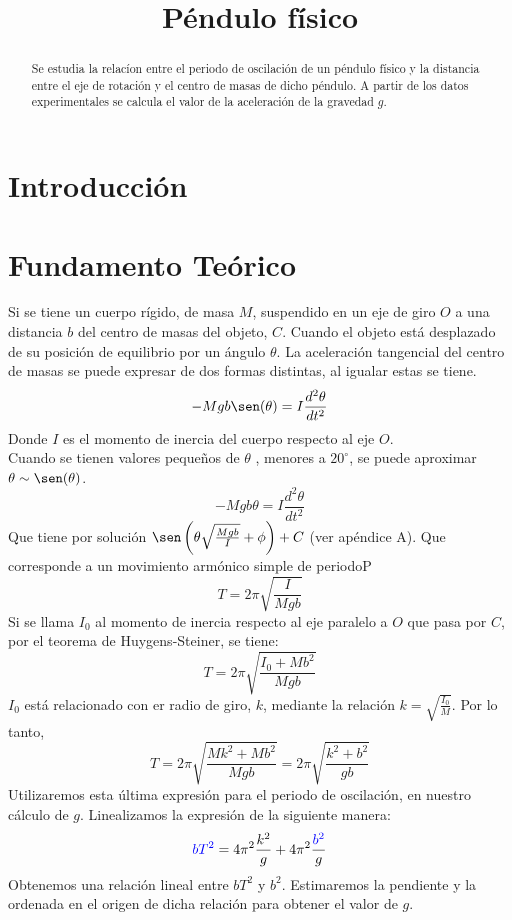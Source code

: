 \documentclass{article}
\title{Péndulo físico}
\author{}
\date{}
\begin{document}
\maketitle
\begin{abstract}
Se estudia la relacíon entre el periodo de oscilación de un péndulo físico y la distancia entre el eje de rotación y el centro de masas de dicho péndulo. A partir de los datos experimentales se calcula el valor de la aceleración de la gravedad $g$.

\end{abstract}
\begin{multicols}{2}
\section{Introducción}

\section{Fundamento Teórico}
Si se tiene un cuerpo rígido, de masa $M$, suspendido en un eje de giro $O$ a una distancia $b$ del centro de masas del objeto, $C$. Cuando el objeto está desplazado de su posición de equilibrio por un ángulo $\theta$. La aceleración tangencial del centro de masas se puede expresar de dos formas distintas, al igualar estas se tiene.
$$
-M g b \sen(\theta) = I \frac{d^2 \theta}{dt^2}
$$
Donde $I$ es el momento de inercia del cuerpo respecto al eje $O$.\\
Cuando se tienen valores pequeños de $\theta$ , menores a $20^\circ$, se puede aproximar $\theta \sim \sen(\theta)$.
$$
-M g b \theta = I \frac{d^2 \theta}{dt^2}
$$
Que tiene por solución $\sen \left( \theta \sqrt{\frac{Mgb}{I}} + \phi \right) + C$ (ver apéndice A). Que corresponde a un movimiento armónico simple de periodoP
$$
T = 2\pi \sqrt{\frac{I}{Mgb}}
$$
Si se llama $I_0$ al momento de inercia respecto al eje paralelo a $O$ que pasa por $C$, por el teorema de Huygens-Steiner, se tiene:
$$
T = 2\pi \sqrt{\frac{I_0 + Mb^2}{Mgb}}
$$
$I_0$ está relacionado con er radio de giro, $k$, mediante la relación $k = \sqrt{\frac{I_0}{M}}$. Por lo tanto,
$$
T = 2\pi \sqrt{\frac{Mk^2 + Mb^2}{Mgb}} = 2\pi \sqrt{\frac{k^2 + b^2}{gb}}
$$
Utilizaremos esta última expresión para el periodo de oscilación, en nuestro cálculo de $g$. Linealizamos la expresión de la siguiente manera:
$$
\textcolor{blue}{bT^2} = 4\pi^2 \frac{k^2}{g} + 4\pi^2 \frac{\textcolor{blue}{b^2}}{g}
$$
Obtenemos una relación lineal entre $bT^2$ y $b^2$. Estimaremos la pendiente y la ordenada en el origen de dicha relación para obtener el valor de $g$.


\end{multicols}
\end{document}
